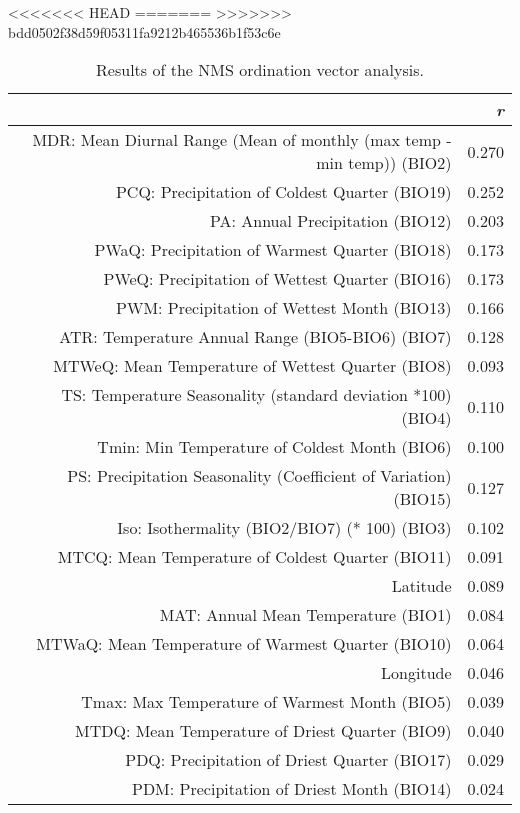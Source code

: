 <<<<<<< HEAD
=======
>>>>>>> bdd0502f38d59f05311fa9212b465536b1f53c6e
\begin{table}[ht]
\centering
\begin{tabular}{rr}
  \hline
 & {\emph{r}} \\ 
  \hline
MDR: Mean Diurnal Range (Mean of monthly (max temp - min temp)) (BIO2) & 0.270 \\ 
  PCQ: Precipitation of Coldest Quarter (BIO19) & 0.252 \\ 
  PA: Annual Precipitation (BIO12) & 0.203 \\ 
  PWaQ: Precipitation of Warmest Quarter (BIO18) & 0.173 \\ 
  PWeQ: Precipitation of Wettest Quarter (BIO16) & 0.173 \\ 
  PWM: Precipitation of Wettest Month (BIO13) & 0.166 \\ 
  ATR: Temperature Annual Range (BIO5-BIO6) (BIO7) & 0.128 \\ 
  MTWeQ: Mean Temperature of Wettest Quarter (BIO8) & 0.093 \\ 
  TS: Temperature Seasonality (standard deviation *100) (BIO4) & 0.110 \\ 
  Tmin: Min Temperature of Coldest Month (BIO6) & 0.100 \\ 
  PS: Precipitation Seasonality (Coefficient of Variation) (BIO15) & 0.127 \\ 
  Iso: Isothermality (BIO2/BIO7) (* 100) (BIO3) & 0.102 \\ 
  MTCQ: Mean Temperature of Coldest Quarter (BIO11) & 0.091 \\ 
  Latitude & 0.089 \\ 
  MAT: Annual Mean Temperature (BIO1) & 0.084 \\ 
  MTWaQ: Mean Temperature of Warmest Quarter (BIO10) & 0.064 \\ 
  Longitude & 0.046 \\ 
  Tmax: Max Temperature of Warmest Month (BIO5) & 0.039 \\ 
  MTDQ: Mean Temperature of Driest Quarter (BIO9) & 0.040 \\ 
  PDQ: Precipitation of Driest Quarter (BIO17) & 0.029 \\ 
  PDM: Precipitation of Driest Month (BIO14) & 0.024 \\ 
   \hline
\end{tabular}
\caption{Results of the NMS ordination vector analysis.} 
\label{tab:wc_vec}
\end{table}
